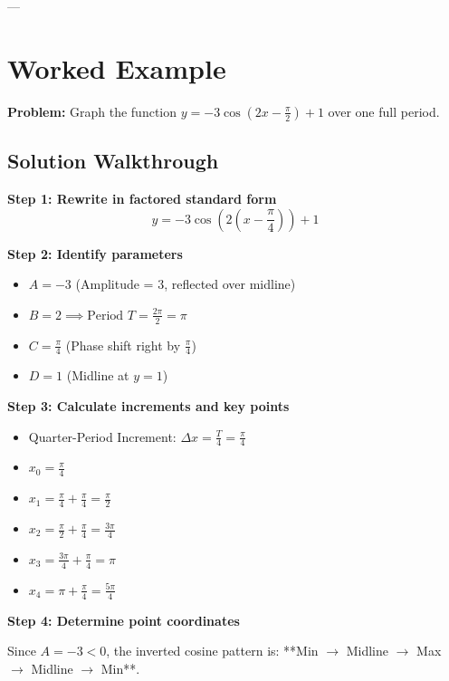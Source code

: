 \documentclass[11pt, a4paper]{article}
\begin{document}
---

\section{Worked Example}

\textbf{Problem:} Graph the function $y = -3 \cos\left(2x - \frac{\pi}{2}\right) + 1$ over one full period.

\subsection*{Solution Walkthrough}

\textbf{Step 1: Rewrite in factored standard form}
\begin{equation*}
y = -3 \cos\left(2\left(x - \frac{\pi}{4}\right)\right) + 1
\end{equation*}

\textbf{Step 2: Identify parameters}
\begin{itemize}
    \item $A = -3$ (Amplitude = $3$, reflected over midline)
    \item $B = 2 \implies \text{Period } T = \frac{2\pi}{2} = \pi$
    \item $C = \frac{\pi}{4}$ (Phase shift right by $\frac{\pi}{4}$)
    \item $D = 1$ (Midline at $y = 1$)
\end{itemize}

\textbf{Step 3: Calculate increments and key points}
\begin{itemize}
    \item Quarter-Period Increment: $\Delta x = \frac{T}{4} = \frac{\pi}{4}$
    \item $x_0 = \frac{\pi}{4}$
    \item $x_1 = \frac{\pi}{4} + \frac{\pi}{4} = \frac{\pi}{2}$
    \item $x_2 = \frac{\pi}{2} + \frac{\pi}{4} = \frac{3\pi}{4}$
    \item $x_3 = \frac{3\pi}{4} + \frac{\pi}{4} = \pi$
    \item $x_4 = \pi + \frac{\pi}{4} = \frac{5\pi}{4}$
\end{itemize}

\textbf{Step 4: Determine point coordinates}

Since $A = -3 < 0$, the inverted cosine pattern is: **Min $\rightarrow$ Midline $\rightarrow$ Max $\rightarrow$ Midline $\rightarrow$ Min**.
\end{document}

